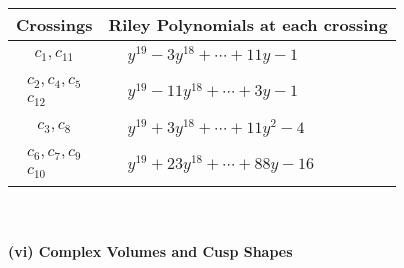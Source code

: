 \documentclass[1p]{elsarticle_modified}
\theoremstyle{definition}
\begin{document}
\begin{tabular}{m{50pt}|m{274pt}}
Crossings & \hspace{64pt}Riley Polynomials at each crossing \\
\hline $$\begin{aligned}c_{1},c_{11}\end{aligned}$$&$\begin{aligned}
&y^{19}-3 y^{18}+\cdots+11 y-1
\end{aligned}$\\
\hline $$\begin{aligned}c_{2},c_{4},c_{5}\\c_{12}\end{aligned}$$&$\begin{aligned}
&y^{19}-11 y^{18}+\cdots+3 y-1
\end{aligned}$\\
\hline $$\begin{aligned}c_{3},c_{8}\end{aligned}$$&$\begin{aligned}
&y^{19}+3 y^{18}+\cdots+11 y^2-4
\end{aligned}$\\
\hline $$\begin{aligned}c_{6},c_{7},c_{9}\\c_{10}\end{aligned}$$&$\begin{aligned}
&y^{19}+23 y^{18}+\cdots+88 y-16
\end{aligned}$\\
\hline
\end{tabular}\\~\\
\newpage\flushleft \textbf{(vi) Complex Volumes and Cusp Shapes}
\end{document}
